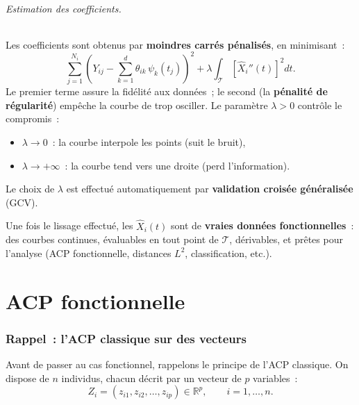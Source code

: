 \documentclass[11pt, a4paper]{article}
\newcommand{\R}{\mathbb{R}}
\begin{document}
\paragraph{Estimation des coefficients.} Les coefficients sont obtenus par \textbf{moindres carr\'es p\'enalis\'es}, en minimisant~:
\[
    \sum_{j=1}^{N_i} \left( Y_{ij} - \sum_{k=1}^{d} \theta_{ik} \, \psi_k(t_j) \right)^2 + \lambda \int_{\mathcal{T}} \left[ \hat{X}_i''(t) \right]^2 dt.
\]
Le premier terme assure la fid\'elit\'e aux donn\'ees~; le second (la \textbf{p\'enalit\'e de r\'egularit\'e}) emp\^eche la courbe de trop osciller. Le param\`etre $\lambda > 0$ contr\^ole le compromis~:
\begin{itemize}[nosep]
    \item $\lambda \to 0$~: la courbe interpole les points (suit le bruit),
    \item $\lambda \to +\infty$~: la courbe tend vers une droite (perd l'information).
\end{itemize}
Le choix de $\lambda$ est effectu\'e automatiquement par \textbf{validation crois\'ee g\'en\'eralis\'ee} (GCV).

\bigskip

Une fois le lissage effectu\'e, les $\hat{X}_i(t)$ sont de \textbf{vraies donn\'ees fonctionnelles}~: des courbes continues, \'evaluables en tout point de $\mathcal{T}$, d\'erivables, et pr\^etes pour l'analyse (ACP fonctionnelle, distances $L^2$, classification, etc.).

\newpage


\part*{ACP fonctionnelle}

\section{Rappel~: l'ACP classique sur des vecteurs}

Avant de passer au cas fonctionnel, rappelons le principe de l'ACP classique. On dispose de $n$ individus, chacun d\'ecrit par un vecteur de $p$ variables~:
\[
    Z_i = (z_{i1}, z_{i2}, \ldots, z_{ip}) \in \R^p, \qquad i = 1, \ldots, n.
\]
\end{document}
